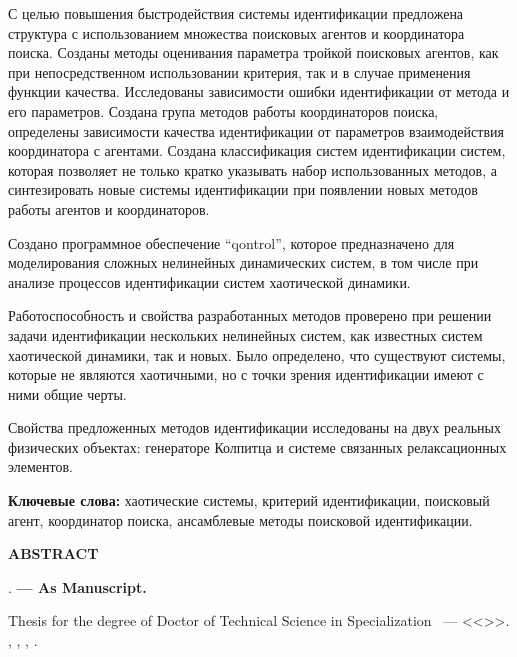 \documentclass[a4paper,13pt]{atuaref}
\newcommand{\xsect}[1]{\vspace{0.15ex}\begin{center}\textbf{#1}\end{center}\vspace{4pt}\penalty10000}
\begin{document}
С целью повышения быстродействия системы идентификации предложена структура с
использованием множества поисковых агентов и координатора поиска.
Созданы методы оценивания параметра тройкой поисковых агентов, как при непосредственном
использовании критерия, так и в случае применения функции качества. Исследованы
зависимости ошибки идентификации от метода и его параметров. Создана
група методов работы координаторов поиска, определены зависимости качества
идентификации от параметров взаимодействия координатора с агентами.
Создана классификация систем идентификации систем,
которая позволяет не только кратко указывать набор
использованных методов, а синтезировать новые системы идентификации при
появлении новых методов работы агентов и координаторов.

Создано программное обеспечение ``qontrol'', которое предназначено для
моделирования сложных нелинейных динамических систем, в том числе при анализе
процессов идентификации систем хаотической динамики.

Работоспособность и свойства разработанных методов проверено при решении задачи
идентификации нескольких нелинейных систем, как известных систем хаотической
динамики, так и новых. Было определено, что существуют системы, которые не
являются хаотичными, но с точки зрения идентификации имеют с ними общие черты.

Свойства предложенных методов идентификации исследованы на двух реальных
физических объектах: генераторе Колпитца и системе связанных релаксационных элементов.


\textbf{Ключевые слова:}
хаотические системы,
критерий идентификации,
поисковый агент,
координатор поиска,
ансамблевые методы поисковой идентификации.


\xsect{ABSTRACT}

\textbf{\dissauthorEn}
\textbf{\booknameEn}.
\textbf{--- As Manuscript.}

Thesis for the degree of Doctor of Technical Science in Specialization
\dissSpecId\ --- <<\dissSpecEn>>.
\institutionEn, \belongEn, \cityEn, \bookyear.
\end{document}
